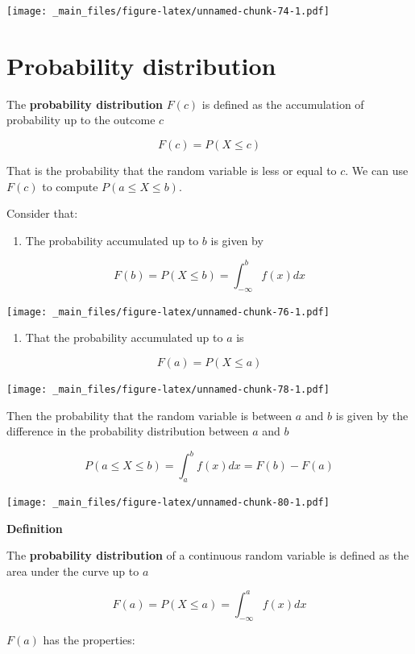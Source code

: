 \documentclass[
]{book}
\providecommand{\tightlist}{%
  \setlength{\itemsep}{0pt}\setlength{\parskip}{0pt}}
\begin{document}
\texttt{[image: \_main\_files/figure-latex/unnamed-chunk-74-1.pdf]}

\hypertarget{probability-distribution-1}{%
\section{Probability distribution}\label{probability-distribution-1}}

The \textbf{probability distribution} \(F(c)\) is defined as the accumulation of probability up to the outcome \(c\)

\[F(c) = P(X \leq c)\]

That is the probability that the random variable is less or equal to \(c\). We can use \(F(c)\) to compute \(P(a \leq X \leq b)\).

Consider that:

\begin{enumerate}
\def\labelenumi{\arabic{enumi})}
\tightlist
\item
  The probability accumulated up to \(b\) is given by
\end{enumerate}

\[F(b) = P(X \leq b)=\int_{-\infty}^bf(x)dx\]

\texttt{[image: \_main\_files/figure-latex/unnamed-chunk-76-1.pdf]}

\begin{enumerate}
\def\labelenumi{\arabic{enumi})}
\setcounter{enumi}{1}
\tightlist
\item
  That the probability accumulated up to \(a\) is
\end{enumerate}

\[F(a) = P(X \leq a)\]

\texttt{[image: \_main\_files/figure-latex/unnamed-chunk-78-1.pdf]}

Then the probability that the random variable is between \(a\) and \(b\) is given by the difference in the probability distribution between \(a\) and \(b\)

\[P(a\leq X \leq b) = \int_a^b f(x)dx=F(b)-F(a)\]

\texttt{[image: \_main\_files/figure-latex/unnamed-chunk-80-1.pdf]}

\textbf{Definition}

The \textbf{probability distribution} of a continuous random variable is defined as the area under the curve up to \(a\)

\[F(a)=P(X\leq a) =\int_{-\infty} ^a f(x)dx\]

\(F(a)\) has the properties:
\end{document}
